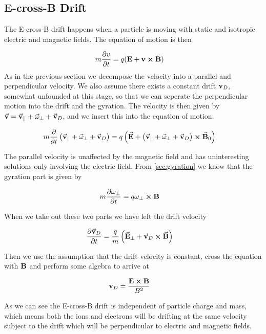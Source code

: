	\subsection{E-cross-B Drift}
	The E-cross-B drift happens when a particle is moving with static and isotropic
	electric and magnetic fields. The equation of motion is then

	\begin{align}
		m\pdv{v}{t} &= q(\vb{E} + \vb{v}\cross\vb{B}) \label{eq:EcrossB}
	\end{align}
	As in the previous section we decompose the velocity into a parallel and perpendicular
 	velocity. We also assume there exists a constant drift \(\vb{v}_D\), somewhat unfounded at this stage,
	so that we can seperate the perpendicular motion into the drift and the gyration.
	The velocity is then given by \(\va{v} = \va{v}_\parallel + \va{\omega}_\perp + \va{v}_D\),
	and we insert this into the equation of motion.

	\begin{align}
		m\pdv{}{t}\left( \va{v}_\parallel + \va{\omega}_\perp + \va{v}_D\right) &=
		q \left( \va{E} +   \left( \va{v}_\parallel + \va{\omega}_\perp +
		\va{v}_D \right)  \cross \va{B}_0 \right)
	\end{align}


	The parallel velocity is unaffected by the magnetic field and has uninteresting
	solutions only involving the electric field. From \cref{sec:gyration} we know that the gyration
	part is given by

	\begin{align}
		m\pdv{\vb{\omega}_\perp}{t} &= q\vb{\vb{\omega}_\perp}\cross\vb{B}
	\end{align}

	When we take out these two parts we have left the drift velocity

	\begin{align}
		\pdv{\va{v}_D}{t} &= \frac{q}{m} \left( \va{E}_\perp + \va{v}_D \cross \va{B} \right)
	\end{align}

	Then we use the assumption that the drift velocity is constant, cross the equation
 	with \(\vb{B}\) and perform some algebra to arrive at

	\begin{align}
		\vb{v}_D &= \frac{\vb{E}\cross\vb{B}}{B^2}
	\end{align}

	As we can see the E-cross-B drift is independent of particle charge and mass,
	which means both the ions and electrons will be drifting at the same velocity
	subject to the drift which will be perpendicular to electric and magnetic fields.
